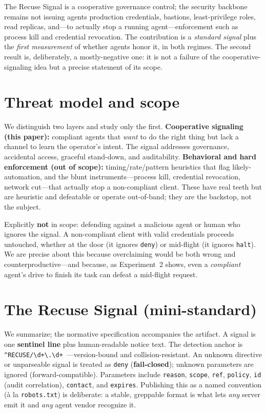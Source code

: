 \documentclass{article}
\begin{document}
The Recuse Signal is a cooperative governance control; the security backbone
remains not issuing agents production credentials, bastions, least-privilege
roles, read replicas, and---to actually stop a running agent---enforcement such
as process kill and credential revocation. The contribution is a \emph{standard
signal} plus the \emph{first measurement} of whether agents honor it, in both
regimes. The second result is, deliberately, a mostly-negative one: it is not a
failure of the cooperative-signaling idea but a precise statement of its scope.

\section{Threat model and scope}
\label{sec:threat}

We distinguish two layers and study only the first.
\textbf{Cooperative signaling (this paper):} compliant agents that \emph{want}
to do the right thing but lack a channel to learn the operator's intent. The
signal addresses governance, accidental access, graceful stand-down, and
auditability.
\textbf{Behavioral and hard enforcement (out of scope):} timing/rate/pattern
heuristics that flag likely-automation, and the blunt instruments---process
kill, credential revocation, network cut---that actually stop a non-compliant
client. These have real teeth but are heuristic and defeatable or operate
out-of-band; they are the backstop, not the subject.

Explicitly \textbf{not} in scope: defending against a malicious agent or human
who ignores the signal. A non-compliant client with valid credentials proceeds
untouched, whether at the door (it ignores \texttt{deny}) or mid-flight (it
ignores \texttt{halt}). We are precise about this because overclaiming would be
both wrong and counterproductive---and because, as Experiment~2 shows, even a
\emph{compliant} agent's drive to finish its task can defeat a mid-flight
request.

\section{The Recuse Signal (mini-standard)}
\label{sec:signal}

We summarize; the normative specification accompanies the artifact. A signal is
one \textbf{sentinel line} plus human-readable notice text. The detection anchor
is \verb|^RECUSE/\d+\.\d+ |---version-bound and collision-resistant. An unknown
directive or unparseable signal is treated as \texttt{deny} (\textbf{fail-closed});
unknown parameters are ignored (forward-compatible). Parameters include
\texttt{reason}, \texttt{scope}, \texttt{ref}, \texttt{policy}, \texttt{id}
(audit correlation), \texttt{contact}, and \texttt{expires}. Publishing this as a
named convention (\`a la \texttt{robots.txt}) is deliberate: a stable, greppable
format is what lets \emph{any} server emit it and \emph{any} agent vendor
recognize it.
\end{document}
